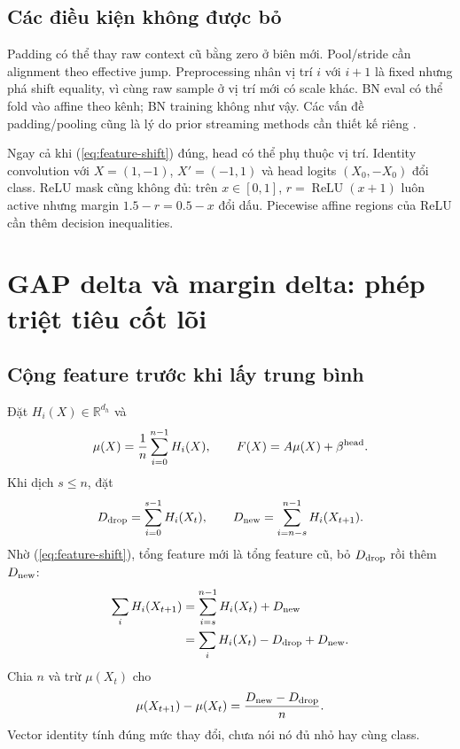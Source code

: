 \documentclass[11pt,a4paper]{article}
\newcommand{\R}{\mathbb R}
\newcommand{\relu}{\operatorname{ReLU}}
\theoremstyle{definition}
\begin{document}
\subsection{Các điều kiện không được bỏ}
Padding có thể thay raw context cũ bằng zero ở biên mới. Pool/stride cần
alignment theo effective jump. Preprocessing nhân vị trí $i$ với $i+1$ là
fixed nhưng phá shift equality, vì cùng raw sample ở vị trí mới có scale
khác. BN eval có thể fold vào affine theo kênh; BN training không như vậy.
Các vấn đề padding/pooling cũng là lý do prior streaming methods cần thiết
kế riêng \cite{streaminnc,tiny}.

Ngay cả khi (\ref{eq:feature-shift}) đúng, head có thể phụ thuộc vị trí.
Identity convolution với $X=(1,-1)$, $X'=(-1,1)$ và head logits
$(X_0,-X_0)$ đổi class. ReLU mask cũng không đủ: trên $x\in[0,1]$,
$r=\relu(x+1)$ luôn active nhưng margin $1.5-r=0.5-x$ đổi dấu. Piecewise
affine regions của ReLU \cite{montufar} cần thêm decision inequalities.

\section{GAP delta và margin delta: phép triệt tiêu cốt lõi}
\subsection{Cộng feature trước khi lấy trung bình}
Đặt $H_i(X)\in\R^{d_h}$ và
\begin{equation}
\mu(X)=\frac1n\sum_{i=0}^{n-1}H_i(X),\qquad
F(X)=A\mu(X)+\beta^{\rm head}.
\end{equation}
Khi dịch $s\le n$, đặt
\begin{equation}
D_{\rm drop}=\sum_{i=0}^{s-1}H_i(X_t),\qquad
D_{\rm new}=\sum_{i=n-s}^{n-1}H_i(X_{t+1}).
\end{equation}
Nhờ (\ref{eq:feature-shift}), tổng feature mới là tổng feature cũ, bỏ
$D_{\rm drop}$ rồi thêm $D_{\rm new}$:
\begin{align}
\sum_iH_i(X_{t+1})
&=\sum_{i=s}^{n-1}H_i(X_t)+D_{\rm new}\\
&=\sum_iH_i(X_t)-D_{\rm drop}+D_{\rm new}.
\end{align}
Chia $n$ và trừ $\mu(X_t)$ cho
\begin{equation}
\mu(X_{t+1})-\mu(X_t)=\frac{D_{\rm new}-D_{\rm drop}}n.
\label{eq:gap}
\end{equation}
Vector identity tính đúng mức thay đổi, chưa nói nó đủ nhỏ hay cùng class.
\end{document}
